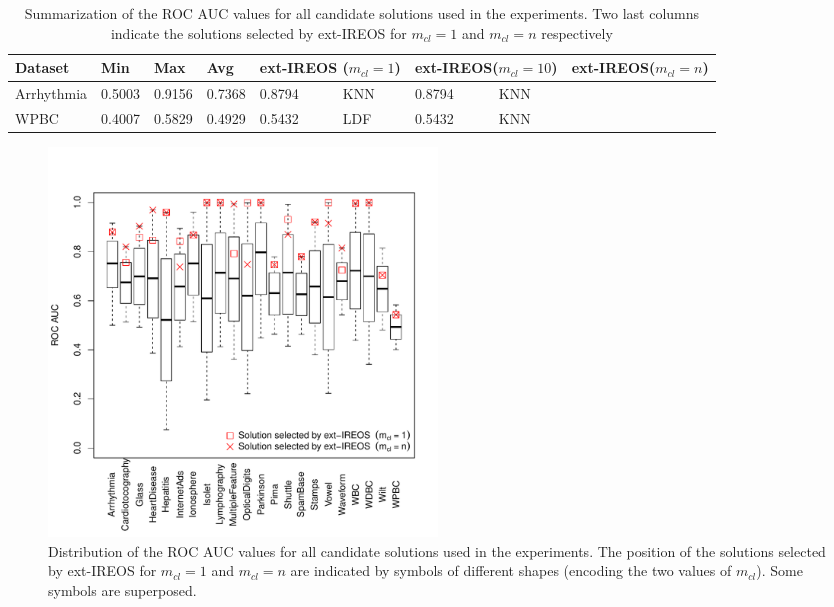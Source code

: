 \documentclass[11pt]{article}
\begin{document}
{\begin{table}[h!]
\footnotesize
\centering
\captionsetup{justification=centering}
\caption{Summarization of the ROC AUC values for all candidate solutions used in the experiments. Two last columns indicate the solutions selected by ext-IREOS for $m_{cl} = 1$ and $m_{cl} = n$ respectively}
\label{tab:model_selection}
\begin{tabular}{@{}llllllllll@{}}
\toprule
\multicolumn{1}{l}{Dataset} & Min & Max & \multicolumn{1}{l}{Avg} & \multicolumn{2}{l}{ext-IREOS ($m_{cl} = 1$)} & \multicolumn{2}{l}{ext-IREOS($m_{cl} = 10$)} & \multicolumn{2}{l}{ext-IREOS($m_{cl} = n$)} \\ \midrule
\multicolumn{1}{l|}{Arrhythmia}        &  0.5003   &   0.9156  & \multicolumn{1}{l|}{0.7368}    &     0.8794     & \multicolumn{1}{l|}{KNN}         &         0.8794           &       \multicolumn{1}{l|}{KNN}      & &        \\
\multicolumn{1}{l|}{WPBC}        &   0.4007  &  0.5829   & \multicolumn{1}{l|}{0.4929}    &      0.5432    & \multicolumn{1}{l|}{LDF}         &            0.5432        &       \multicolumn{1}{l|}{KNN}          & &    \\ \bottomrule
\end{tabular}
\end{table}

\begin{figure}[ht!]
\center
\includegraphics[width=0.5\textwidth]{figs/boxplot.pdf}
\captionsetup{justification=centering}
\caption{Distribution of the ROC AUC values for all candidate solutions used in the experiments. The position of the solutions selected by ext-IREOS for $m_{cl} = 1$ and $m_{cl} = n$ are indicated by symbols of different shapes (encoding the two values of $m_{cl}$). Some symbols are superposed.}
\label{fig:boxplot}
\end{figure}

}
\end{document}
